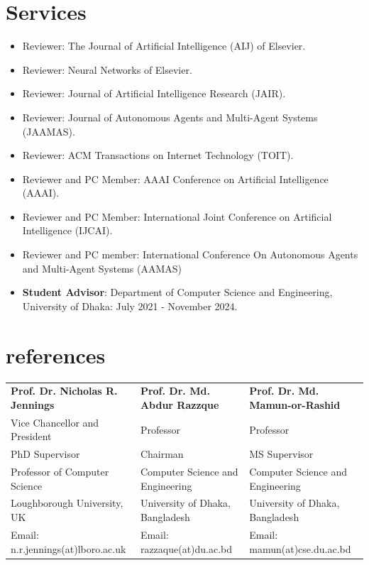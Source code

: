 \documentclass{article}
\begin{document}
\section{Services}
\begin{itemize}
\item Reviewer: The Journal of Artificial Intelligence (AIJ) of Elsevier.
\item Reviewer: Neural Networks of Elsevier.
\item Reviewer: Journal of Artificial Intelligence Research (JAIR).
\item Reviewer: Journal of Autonomous Agents and Multi-Agent Systems (JAAMAS).
\item Reviewer: ACM Transactions on Internet Technology (TOIT).
\item Reviewer and PC Member: AAAI Conference on Artificial Intelligence (AAAI).
\item Reviewer and PC Member: International Joint Conference on Artificial Intelligence (IJCAI).
\item Reviewer and PC member: International Conference On Autonomous Agents and Multi-Agent Systems (AAMAS)
\item \textbf{Student Advisor}: Department of Computer Science and Engineering, University of Dhaka: July 2021 - November 2024.
\end{itemize}

 
  
\nocite{*}



\section{references}

\begin{tabularx}{\textwidth} { 
   >{\raggedright\arraybackslash}X 
   >{\raggedright\arraybackslash}X 
   >{\raggedright\arraybackslash}X   }
 
 \textbf{Prof. Dr. Nicholas R. Jennings}     & \textbf{Prof. Dr. Md. Abdur Razzque} & \textbf{Prof. Dr. Md. Mamun-or-Rashid} \\


Vice Chancellor and President    &  Professor  & Professor  \\
PhD Supervisor    & Chairman  & MS Supervisor  \\
Professor of Computer Science  & Computer Science and Engineering  & Computer Science and Engineering  \\
Loughborough University, UK & University of Dhaka, Bangladesh  & University of Dhaka, Bangladesh  \\
  Email: n.r.jennings(at)lboro.ac.uk  & Email: razzaque(at)du.ac.bd & Email:  mamun(at)cse.du.ac.bd  

\end{tabularx}
\end{document}
